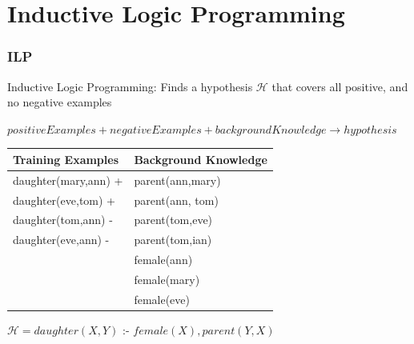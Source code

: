 \documentclass{beamer}
\begin{document}
\section{Inductive Logic Programming}
\begin{frame}
\frametitle{ILP}
 Inductive Logic Programming: Finds a hypothesis $\mathcal{H}$ that covers all positive, and no negative examples
  \begin{fontsize}{10}{10}
    \begin{center}
    $positiveExamples + negativeExamples + background Knowledge \rightarrow hypothesis$
    \end{center}

    \begin{table}
      \begin{tabular}{ l  l }
      \toprule
      \textbf{Training Examples} & \textbf{Background Knowledge}\\
      \midrule
      daughter(mary,ann) +	& parent(ann,mary)	\\
      daughter(eve,tom)  +	& parent(ann, tom)	\\
      daughter(tom,ann)  - 	& parent(tom,eve)	\\
      daughter(eve,ann)  -	& parent(tom,ian) 	\\
				& female(ann)		\\
				& female(mary)		\\
				& female(eve)		\\
      \bottomrule
      \end{tabular}
    \end{table}
    \begin{center}
      $\mathcal{H} = daughter(X,Y)$ :- $female(X),parent(Y,X)$ 
    \end{center}


  \end{fontsize}
\end{frame}
\end{document}
